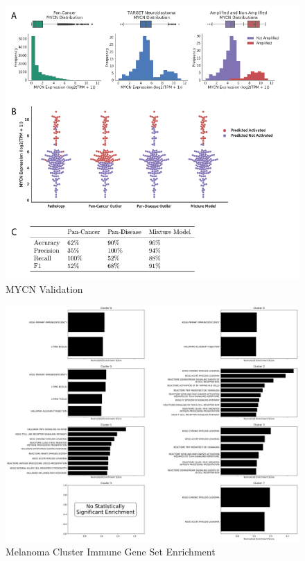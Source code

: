 \documentclass[fleqn,10pt]{wlscirep}
\begin{document}

\begin{figure}
	\centering
	\includegraphics[width=0.75\linewidth]{images/MYCN-Figure.png}
	\caption{MYCN Validation}
	\label{sfig:mycn}
\end{figure}


\begin{figure}
	\centering
	\includegraphics[width=0.75\linewidth]{images/melanoma-immune-subtype-enrichment.png}
	\caption{Melanoma Cluster Immune Gene Set Enrichment}
	\label{sfig:melanoma-gsea}
\end{figure}
\end{document}
